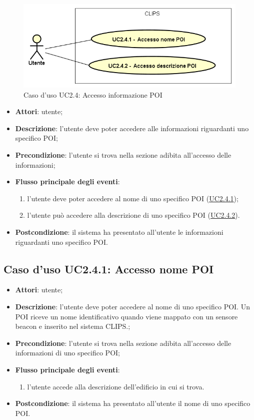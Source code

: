 \documentclass[../AnalisiDeiRequisiti.tex]{subfiles}
\begin{document}
\begin{figure}[H]
	\centering
	\includegraphics[scale=0.95, width=\textwidth]{img/UC2-4.png}
	\caption{Caso d'uso UC2.4: Accesso informazione POI}\label{fig:UC2.4} 
\end{figure}
\begin{itemize}
	\item \textbf{Attori}: utente;
	\item \textbf{Descrizione}: l'utente deve poter accedere alle informazioni riguardanti uno specifico POI; 
	\item \textbf{Precondizione}: l'utente si trova nella sezione adibita all'accesso delle informazioni;
	
	\item \textbf{Flusso principale degli eventi}:
	\begin{enumerate}
		\item l'utente deve poter accedere al nome di uno specifico POI (\hyperlink{UC2.4.1}{UC2.4.1});
		\item l'utente può accedere alla descrizione di uno specifico POI (\hyperlink{UC2.4.2}{UC2.4.2}).
		
	\end{enumerate}
	\item \textbf{Postcondizione}: il sistema ha presentato all'utente le informazioni riguardanti uno specifico POI.
\end{itemize}
\hypertarget{UC2.4.1}{}
\subsection{Caso d'uso UC2.4.1: Accesso nome POI}
\begin{itemize}
	\item \textbf{Attori}: utente;
	\item \textbf{Descrizione}: l'utente deve poter accedere al nome di uno specifico POI. Un POI riceve un nome identificativo quando viene mappato con un sensore beacon e inserito nel sistema CLIPS.; 
	\item \textbf{Precondizione}: l'utente si trova nella sezione adibita all'accesso delle informazioni di uno specifico POI;
	
	\item \textbf{Flusso principale degli eventi}:
	\begin{enumerate}
		\item l'utente accede alla descrizione dell'edificio in cui si trova.
		
	\end{enumerate}
	\item \textbf{Postcondizione}: il sistema ha presentato all'utente il nome di uno specifico POI.
\end{itemize}
\hypertarget{UC2.4.2}{}
\end{document}
